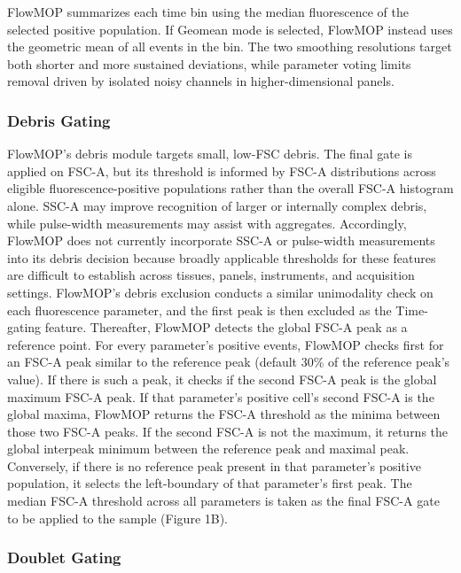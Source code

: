 \documentclass[ASNA]{latex/wiley/USG}
\begin{document}
FlowMOP summarizes each time bin using the median fluorescence of the
selected positive population. If Geomean mode is selected, FlowMOP
instead uses the geometric mean of all events in the bin. The two
smoothing resolutions target both shorter and more sustained deviations,
while parameter voting limits removal driven by isolated noisy channels
in higher-dimensional panels.

\subsubsection{Debris Gating}\label{debris-gating}

FlowMOP's debris module targets small, low-FSC debris. The final gate is
applied on FSC-A, but its threshold is informed by FSC-A distributions
across eligible fluorescence-positive populations rather than the
overall FSC-A histogram alone. SSC-A may improve recognition of larger
or internally complex debris, while pulse-width measurements may assist
with aggregates. Accordingly, FlowMOP does not currently incorporate
SSC-A or pulse-width measurements into its debris decision because
broadly applicable thresholds for these features are difficult to
establish across tissues, panels, instruments, and acquisition settings.
FlowMOP's debris exclusion conducts a similar unimodality check on each
fluorescence parameter, and the first peak is then excluded as the
Time-gating feature. Thereafter, FlowMOP detects the global FSC-A peak
as a reference point. For every parameter's positive events, FlowMOP
checks first for an FSC-A peak similar to the reference peak (default
30\% of the reference peak's value). If there is such a peak, it checks
if the second FSC-A peak is the global maximum FSC-A peak. If that
parameter's positive cell's second FSC-A is the global maxima, FlowMOP
returns the FSC-A threshold as the minima between those two FSC-A peaks.
If the second FSC-A is not the maximum, it returns the global interpeak
minimum between the reference peak and maximal peak. Conversely, if
there is no reference peak present in that parameter's positive
population, it selects the left-boundary of that parameter's first peak.
The median FSC-A threshold across all parameters is taken as the final
FSC-A gate to be applied to the sample (Figure 1B).

\subsubsection{Doublet Gating}\label{doublet-gating}
\end{document}
